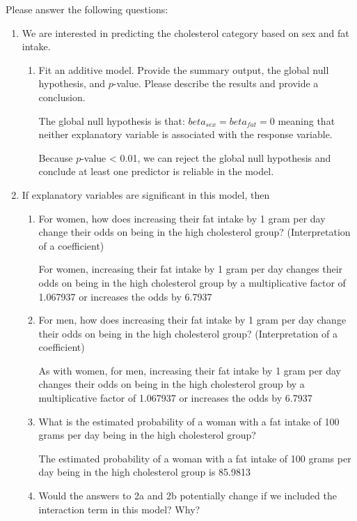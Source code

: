 \documentclass[12pt,letterpaper]{article}
\begin{document}
\newpage
\noindent Please answer the following questions:

\begin{enumerate}
	\item
	We are interested in predicting the cholesterol category based on sex and fat intake.
	\begin{enumerate}
		\item
		Fit an additive model. Provide the summary output, the global null hypothesis, and $p$-value. Please describe the results and provide a conclusion.
		  
		The global null hypothesis is that: $beta_{sex} = beta_{fat} = 0$ meaning that neither explanatory variable is associated with the response variable.
		  
		Because $p$-value < 0.01, we can reject the global null hypothesis and conclude at least one predictor is reliable in the model.
	\end{enumerate}
	
	\item
	If explanatory variables are significant in this model, then
	\begin{enumerate}
		\item
		For women, how does increasing their fat intake by 1 gram per day change their odds on being in the high cholesterol group? (Interpretation of a coefficient)
		
		  
		
		For women, increasing their fat intake by 1 gram per day changes their odds on being in the high cholesterol group by a multiplicative factor of 1.067937 or increases the odds by 6.7937%
		\item
		For men, how does increasing their fat intake by 1 gram per day change their odds on being in the high cholesterol group? (Interpretation of a coefficient)
		
		As with women, for men, increasing their fat intake by 1 gram per day changes their odds on being in the high cholesterol group by a multiplicative factor of 1.067937 or increases the odds by 6.7937%
		\item
		What is the estimated probability of a woman with a fat intake of 100 grams per day being in the high cholesterol group? 
		
		  
		
		The estimated probability of a woman with a fat intake of 100 grams per day being in the high cholesterol group is 85.9813%
		\item
		Would the answers to 2a and 2b potentially change if we included the interaction term in this model? Why? 
		

\end{enumerate}
\end{enumerate}
\end{document}
